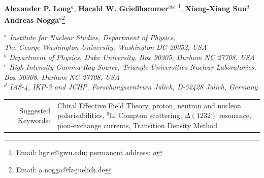 \documentclass[12pt]{article}
\title{\mytitle}
\author{\myname}
\newcommand{\ChiEFT}{$\chi$EFT\;}
\newcommand{\LiS}{{}^{6} \mathrm{Li} }
\newcommand{\sixLi}{{}^{6} \mathrm{Li} }
\newcommand{\myauthor}[1]{\textbf{#1}}
\newcommand{\myaddress}[1]{\textit{#1}}
\newcommand{\3}{\ss}
\newcommand{\calO}{\mathcal{O}} \newcommand{\calP}{\mathcal{P}}
\numberwithin{equation}{section}
\begin{document}
\begin{titlepage}
  \maketitle
  \begin{center}
    \myauthor{Alexander P. Long$^a$},
    \myauthor{Harald W. Grie\ss hammer$^{abc}$} \footnote{Email:
    hgrie@gwu.edu; permanent address: \emph{a}}, %
    \myauthor{Xiang-Xiang Sun$^{d}$}
    \\[0.5ex]
    \myauthor{Andreas Nogga$^{d}$}\footnote{Email: a.nogga@fz-juelich.de}

    \vspace*{0.2cm}
    \myaddress{$^a$ Institute for Nuclear Studies, Department of Physics, \\The
    George Washington University, Washington DC 20052, USA}
    \\[0.7ex]
    \myaddress{$^b$ Department of Physics, Duke University, Box 90305, Durham NC
    27708, USA}
    \\[0.7ex]
    \myaddress{$^c$ High Intensity Gamma-Ray Source, Triangle Universities
    Nuclear Laboratories,\\ Box 90308, Durham NC 27708, USA}
    \\[0.7ex]
    \myaddress{$^d$ IAS-4, IKP-3 and JCHP, Forschungszentrum J\"ulich, D-52428
    J\"ulich, Germany}
    \\[0.7ex]
  \end{center}

  \begin{abstract}
    We present the first \emph{ab initio} calculation of elastic
    Compton scattering from $\LiS$.
    It is carried out to $\calO(e^2 \delta^3)$ in the $\delta$
    expansion of \ChiEFT.
    We assess the sensitivity of the cross-section to bean asymmetry
    and nucleon polarisabilities.
  \end{abstract}
  \begin{tabular}{rl}
    Suggested Keywords: &
    \begin{minipage}[t]{10.5cm}
      Chiral Effective Field Theory,
      proton, neutron and nucleon
      polarisabilities, $\sixLi$ Compton scattering,
      $\Delta(1232)$ resonance, pion-exchange currents, Transition
      Density Method
    \end{minipage}
  \end{tabular}
\end{titlepage}
\end{document}
